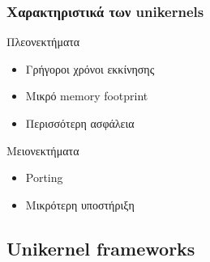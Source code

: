 \documentclass[red,slidestop,notes,compress,mathserif]{beamer}
\begin{document}
\begin{frame}
\frametitle{Χαρακτηριστικά των unikernels}
\begin{block}{Πλεονεκτήματα}
\begin{itemize}
\item Γρήγοροι χρόνοι εκκίνησης
\item Μικρό memory footprint
\item Περισσότερη ασφάλεια
\end{itemize}
\end{block}
\begin{block}{Μειονεκτήματα}
\begin{itemize}
\item Porting
\item Μικρότερη υποστήριξη 
\end{itemize}
\end{block}
\end{frame}

\subsection{Unikernel frameworks}
\end{document}
